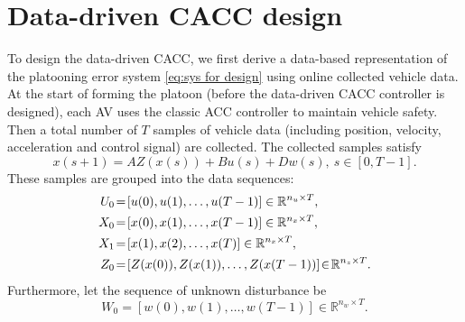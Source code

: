 \documentclass[letterpaper, 10 pt, conference]{ieeeconf}
\begin{document}
	\section{Data-driven CACC design}\label{sec:control for AV platoon}
	To design the data-driven CACC, we first derive a data-based representation of the platooning error 
	system \eqref{eq:sys for design} using online collected vehicle data.  
	At the start of forming the platoon (before the data-driven CACC controller is designed), each AV uses the classic ACC controller \cite{Shladover+12} to maintain vehicle safety. Then a total number of $T$ samples of vehicle data (including position, velocity, acceleration and control signal) are collected. 
	The collected samples satisfy
	\begin{equation}\label{eq:data dynamics}
		x(s+1) = A Z(x(s)) + B u(s) + D w(s), ~s \in [0,T-1].	
	\end{equation}
	These samples are grouped into the data sequences:
	\begin{subequations}\label{eq:data seq1}	
		\begin{align}
			\setlength{\parindent}{0in}		
			U_0 \!&=\! [u(0), u(1), \dots, u(T-1)] \in \mathbb{R}^{n_u \times T}, \\
			X_0 \!&=\! [x(0), x(1), \dots, x(T-1)] \in \mathbb{R}^{n_x \times T}, \\
			X_1 \!&=\! [x(1), x(2), \dots, x(T)] \in \mathbb{R}^{n_x \times T}, \\
			\!Z_0 \!&=\! [Z(x(0)), Z(x(1)), \dots, Z(x(T-1))] \!\in\! \mathbb{R}^{n_z \times T}. 
		\end{align}	
	\end{subequations}
	Furthermore, let the sequence of unknown disturbance be
	\begin{equation}\label{eq:data seq2}
		W_0 = [w(0),w(1),\dots,w(T-1)] \in \mathbb{R}^{n_w \times T}.
	\end{equation}
	
\end{document}
